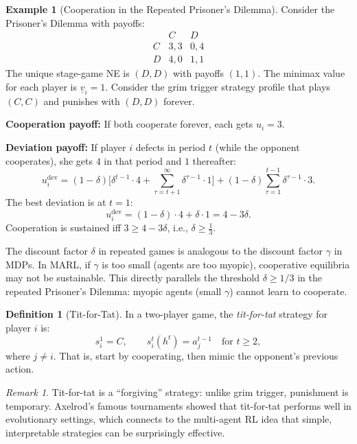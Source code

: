 \documentclass[11pt,a4paper]{article}
\theoremstyle{definition}
\newtheorem{definition}{Definition}[section]
\newtheorem{example}{Example}[section]
\theoremstyle{plain}
\theoremstyle{remark}
\newtheorem{remark}{Remark}[section]
\begin{document}
\begin{example}[Cooperation in the Repeated Prisoner's Dilemma]
\label{ex:repeated-pd}
Consider the Prisoner's Dilemma with payoffs:
\[
\begin{array}{c|cc}
  & C & D \\ \hline
C & 3,3 & 0,4 \\
D & 4,0 & 1,1
\end{array}
\]
The unique stage-game NE is $(D,D)$ with payoffs $(1,1)$. The minimax value for each
player is $\underline{v}_i = 1$. Consider the grim trigger strategy profile that plays
$(C,C)$ and punishes with $(D,D)$ forever.

\textbf{Cooperation payoff:} If both cooperate forever, each gets $u_i = 3$.

\textbf{Deviation payoff:} If player $i$ defects in period $t$ (while the opponent
cooperates), she gets $4$ in that period and $1$ thereafter:
\[
    u_i^{\text{dev}} = (1-\delta)\bigl[\delta^{t-1} \cdot 4 + \sum_{\tau=t+1}^{\infty}
    \delta^{\tau-1} \cdot 1\bigr]
    + (1-\delta) \sum_{\tau=1}^{t-1} \delta^{\tau-1} \cdot 3.
\]
The best deviation is at $t=1$:
\[
    u_i^{\text{dev}} = (1-\delta) \cdot 4 + \delta \cdot 1 = 4 - 3\delta.
\]
Cooperation is sustained iff $3 \geq 4 - 3\delta$, i.e., $\delta \geq \frac{1}{3}$.
\end{example}

\begin{rlconnection}
The discount factor $\delta$ in repeated games is analogous to the discount factor $\gamma$
in MDPs. In MARL, if $\gamma$ is too small (agents are too myopic), cooperative equilibria
may not be sustainable. This directly parallels the threshold $\delta \geq 1/3$ in the
repeated Prisoner's Dilemma: myopic agents (small $\gamma$) cannot learn to cooperate.
\end{rlconnection}

\begin{definition}[Tit-for-Tat]
\label{def:tit-for-tat}
In a two-player game, the \emph{tit-for-tat} strategy for player $i$ is:
\[
    s_i^1 = C, \qquad s_i^t(h^t) = a_j^{t-1} \quad \text{for } t \geq 2,
\]
where $j \neq i$. That is, start by cooperating, then mimic the opponent's previous action.
\end{definition}

\begin{remark}
Tit-for-tat is a ``forgiving'' strategy: unlike grim trigger, punishment is temporary.
Axelrod's famous tournaments showed that tit-for-tat performs well in evolutionary settings,
which connects to the multi-agent RL idea that simple, interpretable strategies can be
surprisingly effective.
\end{remark}
\end{document}
